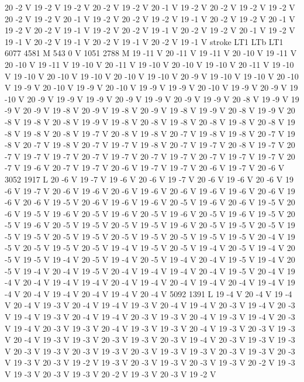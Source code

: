 {{{{{20 -2 V
19 -2 V
19 -2 V
20 -2 V
19 -2 V
20 -1 V
19 -2 V
20 -2 V
19 -2 V
19 -2 V
20 -2 V
19 -2 V
20 -1 V
19 -2 V
20 -2 V
19 -2 V
19 -1 V
20 -2 V
19 -2 V
20 -1 V
19 -2 V
20 -2 V
19 -1 V
19 -2 V
20 -2 V
19 -1 V
20 -2 V
19 -2 V
20 -1 V
19 -2 V
19 -1 V
20 -2 V
19 -1 V
20 -2 V
19 -1 V
20 -2 V
19 -1 V
stroke
LT1
LTb
LT1
6077 4581 M
543 0 V
1051 2788 M
19 -11 V
20 -11 V
19 -11 V
20 -10 V
19 -11 V
20 -10 V
19 -11 V
19 -10 V
20 -11 V
19 -10 V
20 -10 V
19 -10 V
20 -11 V
19 -10 V
19 -10 V
20 -10 V
19 -10 V
20 -10 V
19 -10 V
20 -9 V
19 -10 V
19 -10 V
20 -10 V
19 -9 V
20 -10 V
19 -9 V
20 -10 V
19 -9 V
19 -9 V
20 -10 V
19 -9 V
20 -9 V
19 -10 V
20 -9 V
19 -9 V
19 -9 V
20 -9 V
19 -9 V
20 -9 V
19 -9 V
20 -8 V
19 -9 V
19 -9 V
20 -9 V
19 -8 V
20 -9 V
19 -8 V
20 -9 V
19 -8 V
19 -9 V
20 -8 V
19 -9 V
20 -8 V
19 -8 V
20 -8 V
19 -9 V
19 -8 V
20 -8 V
19 -8 V
20 -8 V
19 -8 V
20 -8 V
19 -8 V
19 -8 V
20 -8 V
19 -7 V
20 -8 V
19 -8 V
20 -7 V
19 -8 V
19 -8 V
20 -7 V
19 -8 V
20 -7 V
19 -8 V
20 -7 V
19 -7 V
19 -8 V
20 -7 V
19 -7 V
20 -8 V
19 -7 V
20 -7 V
19 -7 V
19 -7 V
20 -7 V
19 -7 V
20 -7 V
19 -7 V
20 -7 V
19 -7 V
19 -7 V
20 -7 V
19 -6 V
20 -7 V
19 -7 V
20 -6 V
19 -7 V
19 -7 V
20 -6 V
19 -7 V
20 -6 V
3052 1917 L
20 -6 V
19 -7 V
19 -6 V
20 -6 V
19 -7 V
20 -6 V
19 -6 V
20 -6 V
19 -6 V
19 -7 V
20 -6 V
19 -6 V
20 -6 V
19 -6 V
20 -6 V
19 -6 V
19 -6 V
20 -6 V
19 -6 V
20 -6 V
19 -5 V
20 -6 V
19 -6 V
19 -6 V
20 -5 V
19 -6 V
20 -6 V
19 -5 V
20 -6 V
19 -5 V
19 -6 V
20 -5 V
19 -6 V
20 -5 V
19 -6 V
20 -5 V
19 -6 V
19 -5 V
20 -5 V
19 -6 V
20 -5 V
19 -5 V
20 -5 V
19 -5 V
19 -6 V
20 -5 V
19 -5 V
20 -5 V
19 -5 V
19 -5 V
20 -5 V
19 -5 V
20 -5 V
19 -5 V
20 -5 V
19 -5 V
19 -5 V
20 -4 V
19 -5 V
20 -5 V
19 -5 V
20 -5 V
19 -4 V
19 -5 V
20 -5 V
19 -4 V
20 -5 V
19 -4 V
20 -5 V
19 -5 V
19 -4 V
20 -5 V
19 -4 V
20 -5 V
19 -4 V
20 -4 V
19 -5 V
19 -4 V
20 -5 V
19 -4 V
20 -4 V
19 -5 V
20 -4 V
19 -4 V
19 -4 V
20 -4 V
19 -5 V
20 -4 V
19 -4 V
20 -4 V
19 -4 V
19 -4 V
20 -4 V
19 -4 V
20 -4 V
19 -4 V
20 -4 V
19 -4 V
19 -4 V
20 -4 V
19 -4 V
20 -4 V
19 -4 V
20 -4 V
5092 1391 L
19 -4 V
20 -4 V
19 -4 V
20 -4 V
19 -3 V
20 -4 V
19 -4 V
19 -3 V
20 -4 V
19 -4 V
20 -3 V
19 -4 V
20 -3 V
19 -4 V
19 -3 V
20 -4 V
19 -4 V
20 -3 V
19 -3 V
20 -4 V
19 -3 V
19 -4 V
20 -3 V
19 -4 V
20 -3 V
19 -3 V
20 -4 V
19 -3 V
19 -3 V
20 -4 V
19 -3 V
20 -3 V
19 -3 V
20 -4 V
19 -3 V
19 -3 V
20 -3 V
19 -3 V
20 -3 V
19 -4 V
20 -3 V
19 -3 V
19 -3 V
20 -3 V
19 -3 V
20 -3 V
19 -3 V
20 -3 V
19 -3 V
19 -3 V
20 -3 V
19 -3 V
20 -3 V
19 -3 V
20 -3 V
19 -2 V
19 -3 V
20 -3 V
19 -3 V
20 -3 V
19 -3 V
20 -2 V
19 -3 V
19 -3 V
20 -3 V
19 -3 V
20 -2 V
19 -3 V
20 -3 V
19 -2 V
}}}}}
